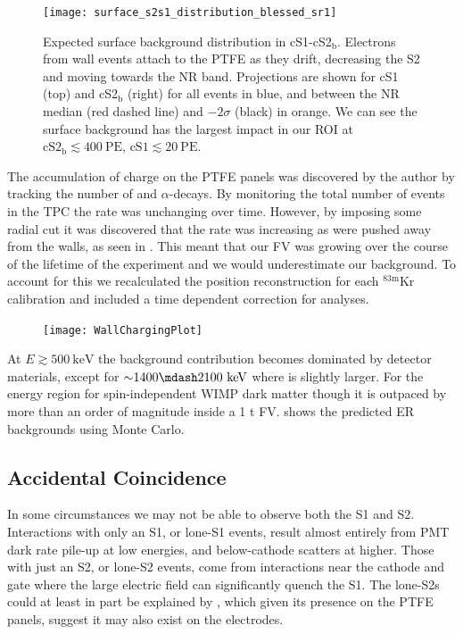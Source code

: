 \begin{figure}
\centering
\texttt{[image: surface\_s2s1\_distribution\_blessed\_sr1]}
\caption{Expected surface background distribution in cS1-cS2$_{\mathrm{b}}$.  Electrons from wall events attach to the PTFE as they drift,
decreasing the S2 and moving towards the NR band.  Projections are
shown for cS1 (top) and cS2$_{\mathrm{b}}$ (right) for all events in blue, and between the NR median (red dashed line) and
$-2 \sigma$ (black) in orange.  We can see the surface background has the largest impact in our ROI at
$\mathrm{cS2_{\mathrm{b}}} \lesssim 400\ \mathrm{PE}$, $\mathrm{cS1} \lesssim 20\ \mathrm{PE}$.}
\label{fig:backgrounds_detector_materials_bands}
\end{figure}

The accumulation of charge on the PTFE panels was discovered by the author by tracking the number of  and 
$\alpha$-decays.  By monitoring the total number of events in the TPC the rate was unchanging over time.  However, by imposing some radial
cut it was discovered that the rate was increasing as \electron were pushed away from the walls, as seen in
.  This meant that our FV was growing over the course of the lifetime of the experiment and we would
underestimate our background.  To account for this we recalculated the position reconstruction for each $\mathrm{^{83m}Kr}$
calibration and included a time dependent correction for analyses.

\begin{figure}
\centering
\texttt{[image: WallChargingPlot]}
\label{fig:backgrounds_wall_charge}
\end{figure}

At $E \gtrsim 500\ \mathrm{keV}$ the background contribution becomes dominated by detector materials, except for
${\sim} 1400 \mdash 2100\ \mathrm{keV}$ where  is slightly larger.  For the energy region for spin-independent WIMP dark matter
though it is outpaced by more than an order of magnitude inside a 1 t FV.   shows the predicted ER
backgrounds using Monte Carlo.



\subsection{Accidental Coincidence}
\label{subsec:backgrounds_ac}
In some circumstances we may not be able to observe both the S1 and S2.  Interactions with only an S1, or lone-S1 events, result almost
entirely from PMT dark rate pile-up at low energies, and below-cathode scatters at higher.  Those with just an S2, or lone-S2 events,
come from interactions near the cathode and gate where the large electric field can significantly quench the S1.  The lone-S2s
could at least in part be explained by , which given its presence on the PTFE panels, suggest it may also exist on the
electrodes.

